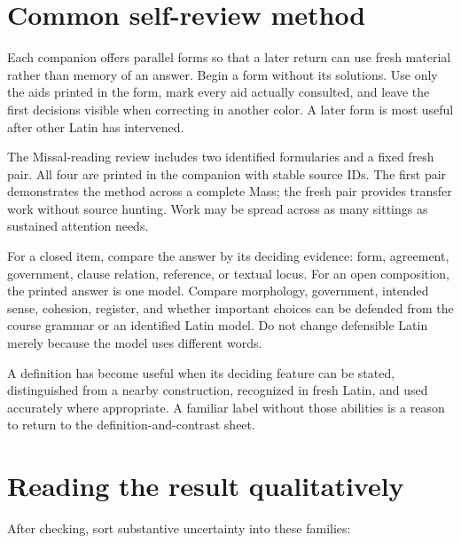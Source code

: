 \chapter{Common self-review method}

Each companion offers parallel forms so that a later return can use fresh
material rather than memory of an answer. Begin a form without its solutions.
Use only the aids printed in the form, mark every aid actually consulted, and
leave the first decisions visible when correcting in another color. A later
form is most useful after other Latin has intervened.

The Missal-reading review includes two identified formularies and a fixed
fresh pair. All four are printed in the companion with stable source IDs. The
first pair demonstrates the method across a complete Mass; the fresh pair
provides transfer work without source hunting.
Work may be spread across as many sittings as sustained attention needs.

For a closed item, compare the answer by its deciding evidence: form,
agreement, government, clause relation, reference, or textual locus. For an
open composition, the printed answer is one model. Compare morphology,
government, intended sense, cohesion, register, and whether important choices
can be defended from the course grammar or an identified Latin model. Do not
change defensible Latin merely because the model uses different words.

A definition has become useful when its deciding feature can be stated,
distinguished from a nearby construction, recognized in fresh Latin, and used
accurately where appropriate. A familiar label without those abilities is a
reason to return to the definition-and-contrast sheet.

\clearpage
\chapter{Reading the result qualitatively}

After checking, sort substantive uncertainty into these families:

